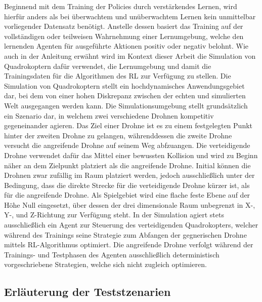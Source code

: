 Beginnend mit dem Training der Policies durch verstärkendes Lernen, wird hierfür anders als bei überwachtem und unüberwachtem Lernen kein unmittelbar vorliegender Datensatz benötigt.
Anstelle dessen basiert das Training auf der vollständigen oder teilweisen Wahrnehmung einer Lernumgebung, welche den lernenden Agenten für ausgeführte Aktionen positiv oder negativ belohnt.
Wie auch in der Anleitung erwähnt wird im Kontext dieser Arbeit die Simulation von Quadrokoptern dafür verwendet, die Lernumgebung und damit die Trainingsdaten für die Algorithmen des RL zur Verfügung zu stellen.
Die Simulation von Quadrokoptern stellt ein hochdynamisches Anwendungsgebiet dar, bei dem von einer hohen Diskrepanz zwischen der echten und simulierten Welt ausgegangen werden kann. 
Die Simulationsumgebung stellt grundsätzlich ein Szenario dar, in welchem zwei verschiedene Drohnen kompetitiv gegeneinander agieren.
Das Ziel einer Drohne ist es zu einem festgelegten Punkt hinter der zweiten Drohne zu gelangen, währenddessen die zweite Drohne versucht die angreifende Drohne auf seinem Weg abfzuangen. 
Die verteidigende Drohne verwendet dafür das Mittel einer bewussten Kollision und wird zu Beginn näher an dem Zielpunkt platziert als die angreifende Drohne. 
Initial können die Drohnen zwar zufällig im Raum platziert werden, jedoch ausschließlich unter der Bedingung, dass die direkte Strecke für die verteidigende Drohne kürzer ist, als für die angreifende Drohne.
Als Spielgebiet wird eine flache feste Ebene auf der Höhe Null eingesetzt, über dessen der drei dimensionale Raum unbegrenzt in X-, Y-, und Z-Richtung zur Verfügung steht.
In der Simulation agiert stets ausschließlich ein Agent zur Steuerung des verteidigenden Quadrokopters, welcher während des Trainings seine Strategie zum Abfangen der gegnerischen Drohne mittels RL-Algorithmus optimiert. 
Die angreifende Drohne verfolgt während der Trainings- und Testphasen des Agenten ausschließlich deterministisch vorgeschriebene Strategien, welche sich nicht zugleich optimieren.

\subsection{Erläuterung der Teststzenarien}

